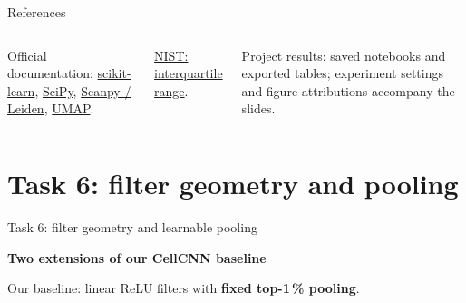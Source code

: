 \documentclass[aspectratio=169,10pt]{beamer}
\newcommand{\slidelabel}{SSBI}
\begin{document}
\begin{frame}{References}
\begin{columns}[T,onlytextwidth]
    Official documentation: \href{https://scikit-learn.org/stable/}{scikit-learn}, \href{https://docs.scipy.org/doc/scipy/}{SciPy}, \href{https://scanpy.readthedocs.io/en/stable/api/generated/scanpy.tl.leiden.html}{Scanpy / Leiden}, \href{https://umap-learn.readthedocs.io/en/latest/how_umap_works.html}{UMAP}.\par\smallskip
    \href{https://www.itl.nist.gov/div898/software/dataplot/refman2/auxillar/iqrange.htm}{NIST: interquartile range}.\par\smallskip
    \textcolor{Muted}{Project results: saved notebooks and exported tables; experiment settings and figure attributions accompany the slides.}
  \end{columns}
\end{frame}

\renewcommand{\slidelabel}{SSBI · Task 6}
\section{Task 6: filter geometry and pooling}
\begin{frame}{Task 6: filter geometry and learnable pooling}

\vspace{3mm}\textbf{Two extensions of our CellCNN baseline}
\begin{center}
\end{center}
Our baseline: linear ReLU filters with \textbf{fixed top-1\,\% pooling}.\\


\end{frame}
\end{document}
